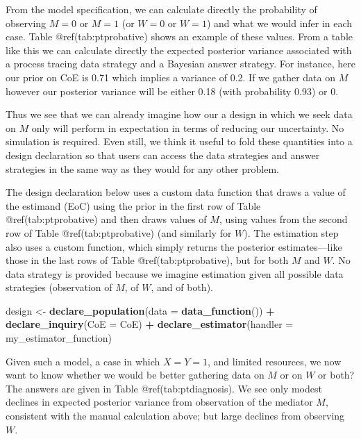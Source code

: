 \documentclass[
]{article}
\newenvironment{Shaded}{\begin{snugshade}}{\end{snugshade}}
\newcommand{\DataTypeTok}[1]{\textcolor[rgb]{0.13,0.29,0.53}{#1}}
\newcommand{\KeywordTok}[1]{\textcolor[rgb]{0.13,0.29,0.53}{\textbf{#1}}}
\newcommand{\NormalTok}[1]{#1}
\newcommand{\OperatorTok}[1]{\textcolor[rgb]{0.81,0.36,0.00}{\textbf{#1}}}
\newcommand{\StringTok}[1]{\textcolor[rgb]{0.31,0.60,0.02}{#1}}
\begin{document}
From the model specification, we can calculate directly the probability
of observing \(M=0\) or \(M=1\) (or \(W=0\) or \(W=1\)) and what we
would infer in each case. Table @ref(tab:ptprobative) shows an example
of these values. From a table like this we can calculate directly the
expected posterior variance associated with a process tracing data
strategy and a Bayesian answer strategy. For instance, here our prior on
CoE is 0.71 which implies a variance of 0.2. If we gather data on \(M\)
however our posterior variance will be either 0.18 (with probability
0.93) or 0.

Thus we see that we can already imagine how our a design in which we
seek data on \(M\) only will perform in expectation in terms of reducing
our uncertainty. No simulation is required. Even still, we think it
useful to fold these quantities into a design declaration so that users
can access the data strategies and answer strategies in the same way as
they would for any other problem.

The design declaration below uses a custom data function that draws a
value of the estimand (EoC) using the prior in the first row of Table
@ref(tab:ptprobative) and then draws values of \(M\), using values from
the second row of Table @ref(tab:ptprobative) (and similarly for \(W\)).
The estimation step also uses a custom function, which simply returns
the posterior estimates---like those in the last rows of Table
@ref(tab:ptprobative), but for both \(M\) and \(W\). No data strategy is
provided because we imagine estimation given all possible data
strategies (observation of \(M\), of \(W\), and of both).

\begin{Shaded}
\begin{Highlighting}[]
\NormalTok{design <-}\StringTok{ }
\StringTok{  }\KeywordTok{declare_population}\NormalTok{(}\DataTypeTok{data =} \KeywordTok{data_function}\NormalTok{()) }\OperatorTok{+}\StringTok{ }
\StringTok{  }\KeywordTok{declare_inquiry}\NormalTok{(}\DataTypeTok{CoE =}\NormalTok{ CoE) }\OperatorTok{+}
\StringTok{  }\KeywordTok{declare_estimator}\NormalTok{(}\DataTypeTok{handler =}\NormalTok{ my_estimator_function)}
\end{Highlighting}
\end{Shaded}

Given such a model, a case in which \(X=Y=1\), and limited resources, we
now want to know whether we would be better gathering data on \(M\) or
on \(W\) or both? The answers are given in Table @ref(tab:ptdiagnosis).
We see only modest declines in expected posterior variance from
observation of the mediator \(M\), consistent with the manual
calculation above; but large declines from observing \(W\).
\end{document}
